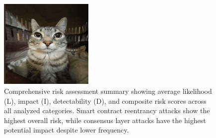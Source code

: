 





\begin{figure}[H]
\centering
\includegraphics[width=0.4\textwidth]{../figure/fig1.png}
\caption{Comprehensive risk assessment summary showing average likelihood (L), impact (I), detectability (D), and composite risk scores across all analyzed categories. Smart contract reentrancy attacks show the highest overall risk, while consensus layer attacks have the highest potential impact despite lower frequency.}
\label{fig:risk_scores_summary}
\end{figure}
